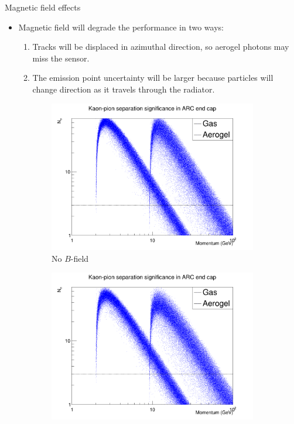 \documentclass{beamer}
\begin{document}
\begin{frame}{Magnetic field effects}
  \begin{itemize}
    \item{Magnetic field will degrade the performance in two ways:}
    \begin{enumerate}
      \item{Tracks will be displaced in azimuthal direction, so aerogel photons may miss the sensor.}
      \item{The emission point uncertainty will be larger because particles will change direction as it travels through the radiator.}
    \end{enumerate}
  \end{itemize}
  \begin{figure}
    \centering
    \begin{subfigure}{0.33\textwidth}
      \includegraphics[width = 1.0\textwidth]{Plots/Significance_Scatter_PionKaon_EndCap_MagOff.png}
      \caption{No $B$-field}
    \end{subfigure}%
    \begin{subfigure}{0.33\textwidth}
      \includegraphics[width = 1.0\textwidth]{Plots/Significance_Scatter_PionKaon_EndCap_MagOn.png}

\end{subfigure}
\end{figure}
\end{frame}
\end{document}
